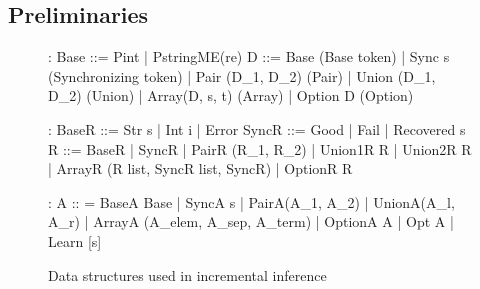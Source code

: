 
\subsection{Preliminaries}

\begin{figure}[t]
{\small 
\begin{code}
:
Base ::= Pint | PstringME(re)
D ::=   
  Base               (Base token)
| Sync s             (Synchronizing token) 
| Pair (D\_1, D\_2)    (Pair)
| Union (D\_1, D\_2)   (Union)
| Array(D, s, t)     (Array)
| Option D           (Option)

:
BaseR ::= Str s | Int i | Error
SyncR ::= Good | Fail | Recovered s 
R ::=
  BaseR
| SyncR
| PairR (R\_1, R\_2)
| Union1R R | Union2R R 
| ArrayR (R list, SyncR list, SyncR)
| OptionR R

\cdmath
{}:
A :: = 
  BaseA Base
| SyncA s
| PairA(A\_1, A\_2)
| UnionA(A\_l, A\_r)
| ArrayA (A\_elem, A\_sep, A\_term)
| OptionA A
| Opt A
| Learn [s]
\end{code}
}
\caption{Data structures used in incremental inference}
\label{fig:data-structures}
\end{figure}

